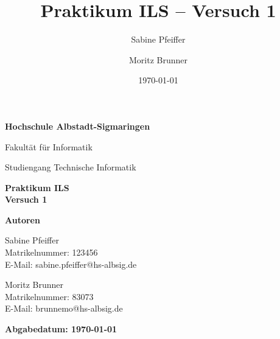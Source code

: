 \documentclass[12pt,a4paper]{scrartcl}
\title{Praktikum ILS – Versuch 1}
\author{Sabine Pfeiffer \and Moritz Brunner}
\date{\today}
\begin{document}
\begin{titlepage}
    \centering
    \vspace*{1.5cm}

    {\LARGE\bfseries Hochschule Albstadt-Sigmaringen \par}
    \vspace{0.5cm}
    {\Large Fakultät für Informatik \par}
    \vspace{0.5cm}
    {\large Studiengang Technische Informatik \par}

    \vspace{2.5cm}

    {\huge\bfseries Praktikum ILS \\[0.3cm] Versuch 1 \par}

    \vspace{2.5cm}

    {\Large\bfseries Autoren \par}
    \vspace{0.5cm}
    {\normalsize
    Sabine Pfeiffer \\
    Matrikelnummer: 123456 \\
    E-Mail: sabine.pfeiffer@hs-albsig.de

    \vspace{1cm}

    Moritz Brunner \\
    Matrikelnummer: 83073 \\
    E-Mail: brunnemo@hs-albsig.de
    }

    \vfill

    {\large\bfseries Abgabedatum: \today \par}

\end{titlepage}

\tableofcontents
\newpage





\end{document}
